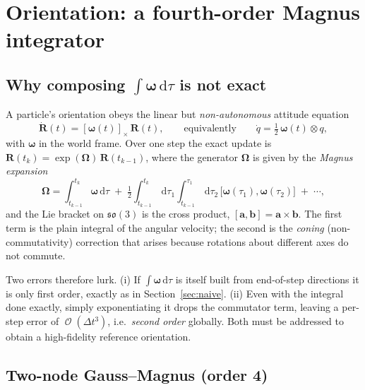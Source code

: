 \documentclass[11pt]{article}
\newcommand{\dd}{\,\mathrm{d}}
\newcommand{\Om}{\Omega}
\newcommand{\bw}{\boldsymbol{\omega}}
\newcommand{\Dt}{\Delta t}
\DeclareMathOperator{\Oo}{\mathcal{O}}
\begin{document}
\section{Orientation: a fourth-order Magnus integrator}
\label{sec:orientation}

\subsection{Why composing $\int\bw\,\mathrm{d}\tau$ is not exact}

A particle's orientation obeys the linear but \emph{non-autonomous} attitude equation
\begin{equation}
  \dot{\mathbf{R}}(t)=[\bw(t)]_\times\,\mathbf{R}(t),
  \qquad\text{equivalently}\qquad
  \dot q=\tfrac12\,\bw(t)\otimes q,
\end{equation}
with $\bw$ in the world frame. Over one step the exact update is
$\mathbf{R}(t_k)=\exp(\boldsymbol{\Om})\,\mathbf{R}(t_{k-1})$, where the generator
$\boldsymbol{\Om}$ is given by the \emph{Magnus expansion}
\begin{equation}
  \boldsymbol{\Om} = \int_{t_{k-1}}^{t_k}\!\bw\dd\tau
  \;+\;\tfrac12\!\int_{t_{k-1}}^{t_k}\!\!\dd\tau_1\!\int_{t_{k-1}}^{\tau_1}\!\!\dd\tau_2\,
        \big[\bw(\tau_1),\bw(\tau_2)\big]
  \;+\;\cdots,
  \label{eq:magnus}
\end{equation}
and the Lie bracket on $\mathfrak{so}(3)$ is the cross product,
$[\mathbf{a},\mathbf{b}]=\mathbf{a}\times\mathbf{b}$. The first term is the plain integral of
the angular velocity; the second is the \emph{coning} (non-commutativity) correction that
arises because rotations about different axes do not commute.

Two errors therefore lurk. (i) If $\int\bw\dd\tau$ is itself built from end-of-step
directions it is only first order, exactly as in Section~\ref{sec:naive}. (ii) Even with
the integral done exactly, simply exponentiating it drops the commutator term, leaving a
per-step error of $\Oo(\Dt^3)$, i.e.\ \emph{second order} globally. Both must be addressed
to obtain a high-fidelity reference orientation.

\subsection{Two-node Gauss--Magnus (order 4)}
\end{document}
